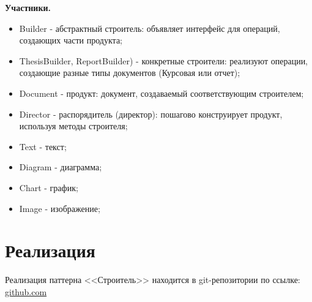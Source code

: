 \documentclass[PI,LAB]{HSEUniversity}
\begin{document}
\textbf{Участники.}
\begin{itemize}
  \item Builder - абстрактный строитель: объявляет интерфейс для операций, создающих части продукта;
  \item ThesisBuilder, ReportBuilder) - конкретные строители: реализуют операции, создающие разные типы документов (Курсовая или отчет);
  \item Document - продукт: документ, создаваемый соответствующим строителем;
  \item Director - распорядитель (директор): пошагово конструирует продукт, используя методы строителя;
  \item Text - текст;
  \item Diagram - диаграмма;
  \item Chart - график;
  \item Image - изображение;
\end{itemize}

\section{Реализация}
Реализация паттерна <<Строитель>> находится в git-репозитории по ссылке: \href{https://github.com/rovany706/design-patterns/tree/Abstract-factory/Builder/src/com/Builder}{github.com}
\end{document}

